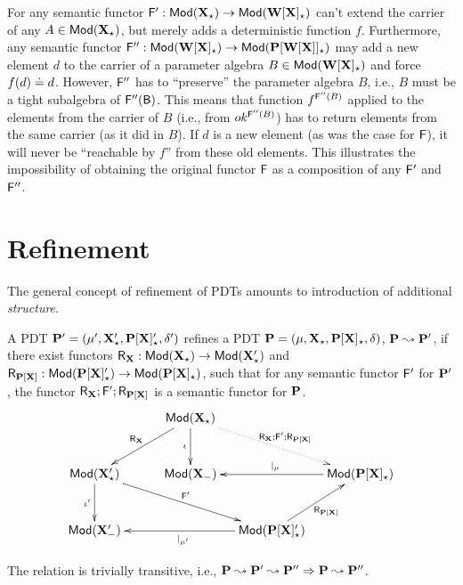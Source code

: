 \begin{example}
For any semantic functor $\fu{F'}: \Mod(\thr{X_\cons}) \to\Mod(\thr{W[X]_\cons})$ 
can't extend the carrier of any $A\in \Mod(\thr{X_\cons})$, but 
merely adds a deterministic function $f$. Furthermore, any semantic functor 
$\fu{F''}: \Mod(\thr{W[X]_\cons}) \to\Mod(\thr{P[W[X]]_\cons})$ may add a
new element $d$ to the carrier of a parameter algebra $B\in\Mod(\thr{W[X]_\cons})$ and force
$f(d)\eleq d$. However, $\fu{F''}$ has to ``preserve'' the parameter algebra
$B$, i.e., $B$ must be a tight subalgebra of
$\fu{F''(B)}$. This means that function $f^{\fu F''(B)}$ applied to the elements
from the carrier of $B$ (i.e., from $ok^{\fu F''(B)}$) has to return elements
from the same carrier (as it did in $B$). If $d$ is a new element (as was the
case for $\fu F$), it will never be ``reachable by $f$'' from these old
elements. This illustrates the impossibility
of obtaining the original functor $\fu F$ as a composition of any $\fu F'$
and $\fu F''$.
\end{example}
%
\section{Refinement}\label{sub:ref}
The general concept of refinement of PDTs
amounts to 
introduction of additional {\em structure}.%

\begin{definition}\label{def:ref}
A PDT $\thr
P'=\pdtsp{\mu'}{\delta'}{\thr{X'_\cons}}{\thr{P[X]'_\cons}}$
refines a PDT $\thr P=\pdt$, 
$\thr P\leadsto\thr P'$, if there exist functors
$\reff X:\Mod(\thr  X_\cons)\to\Mod(\thr X'_\cons)$ and
$\reff{P[X]}:\Mod(\thr {P[X]'_\cons})\to\Mod(\thr{P[X]_\cons})$, such that
for any semantic functor $\fu F'$ for $\thr P'$, the functor $\reff X;\fu
F';\reff{P[X]}$ is a semantic functor for $\thr P$.
\[ \xymatrix@R=0.4cm@C=0.4cm{
&& \Mod(\thr{X_\cons})  \ar[dd]_{\iota} \ar@{.>}[rrdd]^{\reff{X};\fu{F}';\reff{P[X]}} \ar[lldd]_{\reff{X}}\\
&& && \\
\Mod(\thr{X'_\cons}) \ar[dd]_{\iota'} \ar[rrrdd]^{\fu{F'}}
	&& \Mod(\thr{X_{\weak}}) %
		&& \Mod(\thr{P[X]_\cons}) \ar[ll]_{|_{\mu}} \\
&& && \\
\Mod(\thr{X'_{\weak}}) %
	&&& \Mod(\thr{P[X]'_\cons}) \ar[lll]^{|_{\mu'}} \ar[uur]_{\reff{P[X]}}
}\vspace*{-2ex}
\]
\end{definition}
The relation is trivially transitive, i.e., $\thr P\leadsto\thr
P'\leadsto\thr P'' \To \thr P\leadsto \thr P''$.

